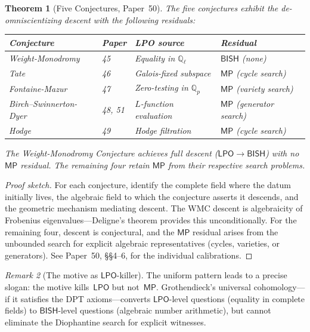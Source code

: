 \documentclass[11pt]{article}
\theoremstyle{plain}
\newtheorem{theorem}{Theorem}[section]
\theoremstyle{definition}
\theoremstyle{remark}
\newtheorem{remark}[theorem]{Remark}
\newcommand{\Q}{\mathbb{Q}}
\newcommand{\Qell}{\Q_\ell}
\newcommand{\Qp}{\Q_p}
\newcommand{\BISH}{\mathsf{BISH}}
\newcommand{\LPO}{\mathsf{LPO}}
\newcommand{\MP}{\mathsf{MP}}
\begin{document}
\begin{theorem}[Five Conjectures, Paper~50]\label{thm:five}
The five conjectures exhibit the de-omniscientizing descent
with the following residuals:

\medskip
\begin{center}
\renewcommand{\arraystretch}{1.15}
\begin{tabular}{@{}llll@{}}
\toprule
\textbf{Conjecture} & \textbf{Paper} & \textbf{LPO source} &
  \textbf{Residual} \\
\midrule
Weight-Monodromy & 45 & Equality in $\Qell$ & $\BISH$ (none) \\
Tate & 46 & Galois-fixed subspace & $\MP$ (cycle search) \\
Fontaine-Mazur & 47 & Zero-testing in $\Qp$ & $\MP$ (variety
  search) \\
Birch--Swinnerton-Dyer & 48, 51 & $L$-function evaluation &
  $\MP$ (generator search) \\
Hodge & 49 & Hodge filtration & $\MP$ (cycle search) \\
\bottomrule
\end{tabular}
\end{center}

\medskip\noindent
The Weight-Monodromy Conjecture achieves full descent
($\LPO \to \BISH$) with no $\MP$ residual.  The remaining four
retain $\MP$ from their respective search problems.
\end{theorem}

\begin{proof}[Proof sketch]
For each conjecture, identify the complete field where the
datum initially lives, the algebraic field to which the
conjecture asserts it descends, and the geometric mechanism
mediating descent.  The WMC descent is algebraicity of Frobenius
eigenvalues---Deligne's theorem provides this unconditionally.
For the remaining four, descent is conjectural, and the $\MP$
residual arises from the unbounded search for explicit algebraic
representatives (cycles, varieties, or generators).
See Paper~50, \S\S4--6, for the individual calibrations.
\end{proof}

\begin{remark}[The motive as $\LPO$-killer]
The uniform pattern leads to a precise slogan: the motive
kills~$\LPO$ but not~$\MP$.  Grothendieck's universal
cohomology---if it satisfies the DPT axioms---converts
$\LPO$-level questions (equality in complete fields) to
$\BISH$-level questions (algebraic number arithmetic), but
cannot eliminate the Diophantine search for explicit witnesses.
\end{remark}
\end{document}
